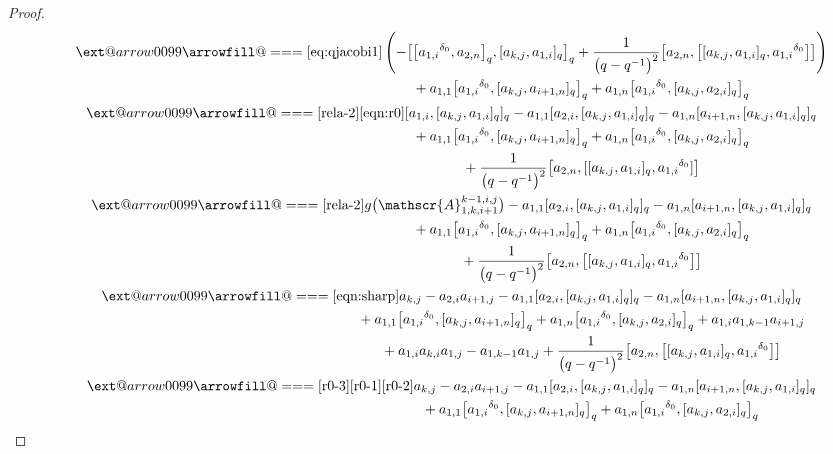 \documentclass[10pt,a4paper]{amsart}
\makeatletter
\def\x@arrow{\DOTSB\Relbar}
\def\xlongequalsignfill@{\arrowfill@\x@arrow\Relbar\x@arrow}
\providecommand{\xlongequal}[2][]{%
	\ext@arrow 0099\xlongequalsignfill@{#1}{#2}}
\numberwithin{equation}{section}
\def\d{\delta}
\def\A{\mathscr{A}}
\makeatother
\begin{document}
\begin{proof}
\begin{gather*}
\qquad \xlongequal{\eqref{eq:qjacobi1}} \left(- \bigl[ \bigl[{a_{1,i}}^{\d_0},a_{2,n} \bigr]_q, [a_{k,j},a_{1,i} ]_q \bigr]_q+\frac{1}{ \bigl(q-q^{-1}\bigr)^2} \bigl[a_{2,n}, \bigl[ [a_{k,j},a_{1,i} ]_q, {a_{1,i}}^{\d_0} \bigr] \bigr] \right)\\
 \phantom{\qquad \xlongequal{\qquad}}{} +a_{1,1} \bigl[{a_{1,i}}^{\d_0}, [a_{k,j},a_{i+1,n} ]_q \bigr]_q +a_{1,n} \bigl[{a_{1,i}}^{\d_0}, [a_{k,j},a_{2,i} ]_q \bigr]_q\\
\qquad \xlongequal[\eqref{rela-2}]{\eqref{eqn:r0}} [a_{1,i}, [a_{k,j},a_{1,i} ]_q ]_q-a_{1,1} [a_{2,i}, [a_{k,j},a_{1,i} ]_q ]_q -a_{1,n} [a_{i+1,n}, [a_{k,j},a_{1,i} ]_q ]_q \\
 \phantom{\qquad \xlongequal{\qquad}}{} +a_{1,1} \bigl[{a_{1,i}}^{\d_0}, [a_{k,j},a_{i+1,n} ]_q \bigr]_q+a_{1,n} \bigl[{a_{1,i}}^{\d_0}, [a_{k,j},a_{2,i} ]_q \bigr]_q \\
 \phantom{\qquad \xlongequal{\qquad}}{} +\frac{1}{ \bigl(q-q^{-1}\bigr)^2} \bigl[a_{2,n}, [ [a_{k,j},a_{1,i} ]_q, {a_{1,i}}^{\d_0} ] \bigr]\\
 \qquad\xlongequal{\eqref{rela-2}} g\bigl(\A_{1,k,i+1}^{k-1,i,j}\bigr)-a_{1,1} [a_{2,i}, [a_{k,j},a_{1,i} ]_q ]_q -a_{1,n} [a_{i+1,n}, [a_{k,j},a_{1,i} ]_q ]_q \\
 \phantom{\qquad \xlongequal{\qquad}}{} +a_{1,1} \bigl[{a_{1,i}}^{\d_0}, [a_{k,j},a_{i+1,n} ]_q \bigr]_q +a_{1,n} \bigl[{a_{1,i}}^{\d_0}, [a_{k,j},a_{2,i} ]_q \bigr]_q\\
 \phantom{\qquad \xlongequal{\qquad}}{} +\frac{1}{ \bigl(q-q^{-1}\bigr)^2} \bigl[a_{2,n}, \bigl[ [a_{k,j},a_{1,i} ]_q, {a_{1,i}}^{\d_0} \bigr] \bigr]\\
\qquad \xlongequal{\eqref{eqn:sharp}} a_{k,j}-a_{2,i}a_{i+1,j} -a_{1,1} [a_{2,i}, [a_{k,j},a_{1,i} ]_q ]_q -a_{1,n} [a_{i+1,n}, [a_{k,j},a_{1,i} ]_q ]_q \\
 \phantom{\qquad \xlongequal{\qquad}}{} +a_{1,1} \bigl[{a_{1,i}}^{\d_0}, [a_{k,j},a_{i+1,n} ]_q \bigr]_q +a_{1,n} \bigl[{a_{1,i}}^{\d_0}, [a_{k,j},a_{2,i} ]_q \bigr]_q+a_{1,i}a_{1,k-1}a_{i+1,j}\\
 \phantom{\qquad \xlongequal{\qquad}}{} +a_{1,i}a_{k,i}a_{1,j} -a_{1,k-1}a_{1,j}+\frac{1}{ \bigl(q-q^{-1}\bigr)^2} \bigl[a_{2,n}, \bigl[ [a_{k,j},a_{1,i} ]_q, {a_{1,i}}^{\d_0} \bigr] \bigr]\\
 \qquad\xlongequal[\eqref{r0-3}]{\eqref{r0-1}\eqref{r0-2} } a_{k,j}-a_{2,i}a_{i+1,j} -a_{1,1} [a_{2,i}, [a_{k,j},a_{1,i} ]_q ]_q -a_{1,n} [a_{i+1,n}, [a_{k,j},a_{1,i} ]_q ]_q \\
 \phantom{\qquad \xlongequal{\qquad}\quad\ }{} +a_{1,1} \bigl[{a_{1,i}}^{\d_0}, [a_{k,j},a_{i+1,n} ]_q \bigr]_q +a_{1,n} \bigl[{a_{1,i}}^{\d_0}, [a_{k,j},a_{2,i} ]_q \bigr]_q \\

\end{gather*}
\end{proof}
\end{document}
